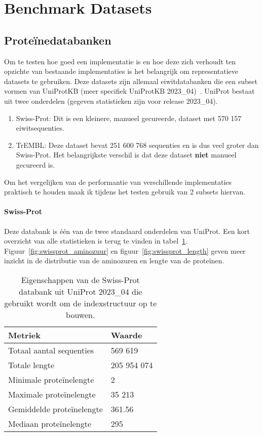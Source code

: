 \section{Benchmark Datasets}\label{sec:datasets}

\subsection{Proteïnedatabanken}\label{subsec:proteine-databanken}
Om te testen hoe goed een implementatie is en hoe deze zich verhoudt ten opzichte van bestaande implementaties is het belangrijk om representatieve datasets te gebruiken.
Deze datasets zijn allemaal eiwitdatabanken die een subset vormen van UniProtKB (meer specifiek UniProtKB 2023\_04)~\cite{UniprotKB}.
UniProt bestaat uit twee onderdelen (gegeven statistieken zijn voor release 2023\_04).
\begin{enumerate}
    \item Swiss-Prot: Dit is een kleinere, manueel gecureerde, dataset met 570 157 eiwitsequenties.
    \item TrEMBL: Deze dataset bevat 251 600 768 sequenties en is dus veel groter dan Swiss-Prot.
    Het belangrijkste verschil is dat deze dataset \textbf{niet} manueel gecureerd is.
\end{enumerate}
Om het vergelijken van de performantie van verschillende implementaties praktisch te houden maak ik tijdens het testen gebruik van 2 subsets hiervan.

\paragraph{Swiss-Prot} Deze databank is één van de twee standaard onderdelen van UniProt.
Een kort overzicht van alle statistieken is terug te vinden in tabel~\ref{tab:swissprot_eigenschappen}.
Figuur~\ref{fig:swissprot_aminozuur} en figuur~\ref{fig:swissprot_length} geven meer inzicht in de distributie van de aminozuren en lengte van de proteïnen.

\begin{table}[h!]
    \centering
    \begin{tabular}{l l}
        Metriek                   & Waarde      \\
        \hline\hline
        Totaal aantal sequenties  & 569 619     \\
        Totale lengte             & 205 954 074 \\
        Minimale proteïnelengte   & 2           \\
        Maximale proteïnelengte   & 35 213      \\
        Gemiddelde proteïnelengte & 361.56      \\
        Mediaan proteïnelengte    & 295         \\
        \hline
    \end{tabular}
    \caption{Eigenschappen van de Swiss-Prot databank uit UniProt 2023\_04 die gebruikt wordt om de indexstructuur op te bouwen.}
    \label{tab:swissprot_eigenschappen}
\end{table}



